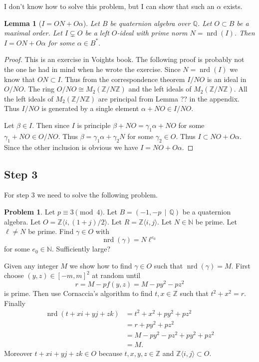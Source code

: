 \documentclass[10pt]{article}
\theoremstyle{plain}
\newtheorem{lemma}[theorem]{Lemma}
\theoremstyle{definition}
\newtheorem{prob}[theorem]{Problem}
\newcommand{\iso}{\cong}
\newcommand{\op}{\operatorname}
\newcommand{\N}{\mathbb{N}}
\newcommand{\Z}{\mathbb{Z}}
\newcommand{\Q}{\mathbb{Q}}
\newcommand{\nrd}{\op{nrd}}
\begin{document}
I don't know how to solve this problem, but I can show that such an \( \alpha \) exists.

\begin{lemma}[\( I = ON + O\alpha \)]
    Let \( B \) be quaternion algebra over \( \Q \).
    Let \( O \subset B \) be a maximal order.
    Let \( I \subsetneq O \) be a left \( O \)-ideal with prime norm \( N = \nrd(I) \).
    Then \( I = ON + O \alpha \) for some \( \alpha \in B^* \).
\end{lemma}
\begin{proof}
    {\color{red} This is an exercise in Voights book. The following proof is probably not the one he had in mind when he wrote the exercise.}
    Since \( N = \nrd(I) \) we know that \( ON \subset I \).
    Thus from the correspondence theorem \( I / NO \) is an ideal in \( O / NO \).
    The ring \( O / NO \iso M_2(\Z / N\Z) \) and the left ideals of \( M_2(\Z / N\Z) \).
    All the left ideals of \( M_2(\Z / N\Z) \) are principal from Lemma ?? in the appendix.
    Thus \( I / NO \) is generated by a single element \( \alpha + NO \in I / NO \).

    Let \( \beta \in I \).
    Then since \( I \) is principle \( \beta + NO = \gamma_1 \alpha + NO\) for some \( \gamma_1 + NO \in O / NO \).
    Thus \( \beta = \gamma_1\alpha + \gamma_2N \) for some \( \gamma_2 \in O \).
    Thus \( I \subset NO + O\alpha \).
    Since the other inclusion is obvious we have \( I =  NO + O\alpha \).
\end{proof}
\subsection{Step 3}
For step 3 we need to solve the following problem.

\begin{prob}
    Let \( p \equiv 3 \pmod{4} \).
    Let \( B =  (-1, -p \, \mid \, \Q) \) be a quaternion algebra.
    Let \( O = \Z \langle i, (1+j) / 2 \rangle \).
    Let \( R = \Z \langle i , j \rangle \).
    Let \( N \in \N \) be prime.
    Let \( \ell \neq N \) be prime.
    Find \( \gamma \in O \) with
    \[
        \nrd(\gamma) = N\ell^{e_0}
    \]
    for some \( e_0 \in \N \). {\color{red} Sufficiently large?}
\end{prob}

Given any integer \( M \) we show how to find \( \gamma \in O \) such that \( \nrd(\gamma) = M \). First choose \( (y, z) \in [-m , m]^2 \) at random until
\[
    r = M - pf(y, z) = M - py^2 - pz^2
\]
is prime.
Then use Cornaccia's algorithm to find \( t, x \in \Z \) such that \(  t^2 + x^2 = r.\)
Finally
\begin{align*}
    \nrd(t + xi + yj + zk)
      & = t^2 + x^2 + py^2 + pz^2       \\
      & = r + py^2 + pz^2               \\
      & = M - py^2 - pz^2 + py^2 + pz^2 \\
      & = M.
\end{align*}
Moreover \( t + xi + yj + zk \in O \) because \( t, x, y, z \in \Z \) and \( \Z \langle i ,j\rangle \subset O \).
\end{document}
